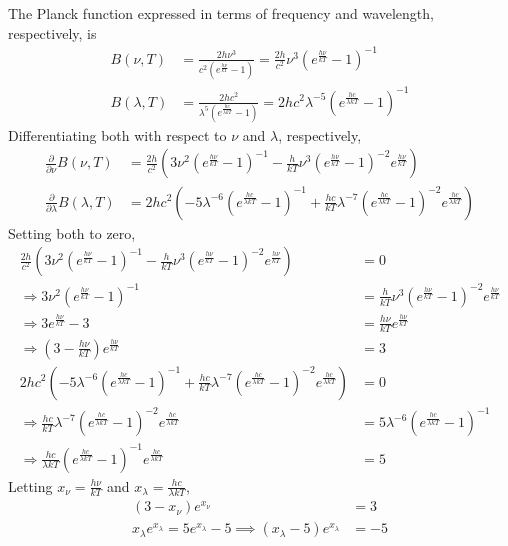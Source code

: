 \documentclass{article}
\begin{document}
The Planck function expressed in terms of frequency and wavelength, respectively, is
\begin{align}
    B(\nu, T) &= \frac{2h \nu^3}{c^2 (e^{\frac{h \nu}{k T}} - 1)} = \frac{2h}{c^2} \nu^3 (e^{\frac{h \nu}{kT}} - 1)^{-1} \\
    B(\lambda, T) &= \frac{2h c^2}{\lambda^5 (e^{\frac{h c}{\lambda k T}} - 1)} = 2hc^2 \lambda^{-5} (e^{\frac{h c}{\lambda k T}} - 1)^{-1}
\end{align}
Differentiating both with respect to \(\nu\) and \(\lambda\), respectively,
\begin{align}
    \frac{\partial}{\partial \nu} B(\nu, T) &= \frac{2h}{c^2} \left(3\nu^2 (e^{\frac{h \nu}{kT}} - 1)^{-1} - \frac{h}{k T} \nu^3 (e^{\frac{h \nu}{k T}} - 1)^{-2} e^{\frac{h \nu}{k T}}\right) \\
    \frac{\partial}{\partial \lambda} B(\lambda, T) &= 2hc^2 \left(-5\lambda^{-6} (e^{\frac{h c}{\lambda k T}} - 1)^{-1} + \frac{h c}{k T}\lambda^{-7} (e^{\frac{h c}{\lambda k T}} - 1)^{-2} e^{\frac{h c}{\lambda k T}}\right)
\end{align}
Setting both to zero,
\begin{align}
    \frac{2h}{c^2} \left(3\nu^2 (e^{\frac{h \nu}{kT}} - 1)^{-1} - \frac{h}{k T} \nu^3 (e^{\frac{h \nu}{k T}} - 1)^{-2}e^{\frac{h \nu}{k T}}\right) &= 0 \\
    \Rightarrow 3\nu^2 (e^{\frac{h \nu}{kT}} - 1)^{-1} &= \frac{h}{k T} \nu^3 (e^{\frac{h \nu}{k T}} - 1)^{-2}e^{\frac{h \nu}{k T}} \\
    \Rightarrow 3e^{\frac{h \nu}{k T}} - 3 &= \frac{h \nu}{k T} e^{\frac{h \nu}{k T}} \\
    \Rightarrow \left(3 - \frac{h \nu}{k T}\right) e^{\frac{h \nu}{k T}} &= 3 \\
    2hc^2 \left(-5\lambda^{-6} (e^{\frac{h c}{\lambda k T}} - 1)^{-1} + \frac{h c}{k T}\lambda^{-7} (e^{\frac{h c}{\lambda k T}} - 1)^{-2} e^{\frac{h c}{\lambda k T}}\right) &= 0 \\
    \Rightarrow \frac{h c}{k T}\lambda^{-7} (e^{\frac{h c}{\lambda k T}} - 1)^{-2} e^{\frac{h c}{\lambda k T}} &= 5\lambda^{-6} (e^{\frac{h c}{\lambda k T}} - 1)^{-1} \\
    \Rightarrow \frac{h c}{\lambda k T} (e^{\frac{h c}{\lambda k T}} - 1)^{-1} e^{\frac{h c}{\lambda k T}} &= 5
\end{align}
Letting \(x_\nu = \frac{h \nu}{k T}\) and \(x_\lambda = \frac{h c}{\lambda k T}\),
\begin{align}
    (3 - x_\nu) e^{x_\nu} &= 3 \\
    x_\lambda e^{x_\lambda} = 5e^{x_\lambda} - 5 \implies (x_\lambda - 5) e^{x_\lambda} &= -5
\end{align}
\end{document}
